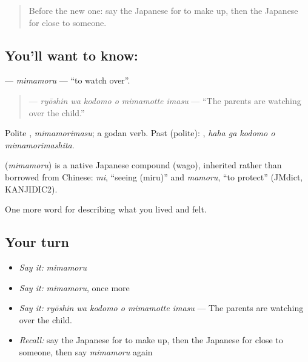 \label{lesson:JA-C479-mimamoru}



\begin{quote}
Before the new one: say the Japanese for to make up, then the Japanese for close to someone.
\end{quote}

\subsection*{You'll want to know: }
\textbf{} — \emph{mimamoru} — \textquotedblleft{}to watch over\textquotedblright{}.

\begin{quote}
\textbf{  } — \emph{ryōshin wa kodomo o mimamotte imasu} — \textquotedblleft{}The parents are watching over the child.\textquotedblright{}
\end{quote}

Polite \textbf{}, \emph{mimamorimasu}; a godan verb. Past (polite): \textbf{  }, \emph{haha ga kodomo o mimamorimashita}.

\begin{cousinweb}
\textbf{} (\emph{mimamoru}) is a native Japanese compound (wago), inherited rather than borrowed from Chinese: \emph{mi}, \textquotedblleft{}seeing (miru)\textquotedblright{} and \emph{mamoru}, \textquotedblleft{}to protect\textquotedblright{} (JMdict, KANJIDIC2).
\end{cousinweb}

\begin{grammarlens}[title={What you've built}]
One more word for describing what you lived and felt.
\end{grammarlens}

\subsection*{Your turn}
\begin{itemize}
\raggedright
  \item \emph{Say it:} \emph{mimamoru}
  \item \emph{Say it:} \emph{mimamoru}, once more
  \item \emph{Say it:} \emph{ryōshin wa kodomo o mimamotte imasu} — The parents are watching over the child.
  \item \emph{Recall:} say the Japanese for to make up, then the Japanese for close to someone, then say \emph{mimamoru} again
\end{itemize}

